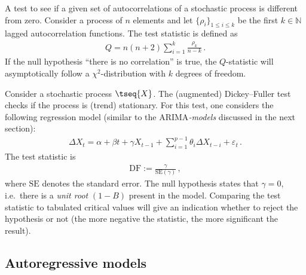     \begin{method}
        A test to see if a given set of autocorrelations of a stochastic process is different from zero. Consider a process of $n$ elements and let $\{\rho_i\}_{1\leq i\leq k}$ be the first $k\in\mathbb{N}$ lagged autocorrelation functions. The test statistic is defined as
        \begin{gather}
            Q = n(n+2)\sum_{i=1}^k\frac{\rho_k}{n-k}\,.
        \end{gather}
        If the null hypothesis ``there is no correlation'' is true, the $Q$-statistic will asymptotically follow a $\chi^2$-distribution with $k$ degrees of freedom.
    \end{method}

    \begin{method}
        Consider a stochastic process $\tseq{X}$. The (augmented) Dickey--Fuller test checks if the process is (trend) stationary. For this test, one considers the following regression model (similar to the ARIMA\textit{-models} discussed in the next section):
        \begin{gather}
            \Delta X_t = \alpha + \beta t + \gamma X_{t-1} + \sum_{i=1}^{p-1} \theta_i\Delta X_{t-i} + \varepsilon_t\,.
        \end{gather}
        The test statistic is
        \begin{gather}
            \mathrm{DF} := \frac{\gamma}{\mathrm{SE}(\gamma)}\,,
        \end{gather}
        where $\mathrm{SE}$ denotes the standard error. The null hypothesis states that $\gamma=0$, i.e.~there is a \textit{unit root} $(1-B)$ present in the model. Comparing the test statistic to tabulated critical values will give an indication whether to reject the hypothesis or not (the more negative the statistic, the more significant the result).
    \end{method}

\subsection{Autoregressive models}


